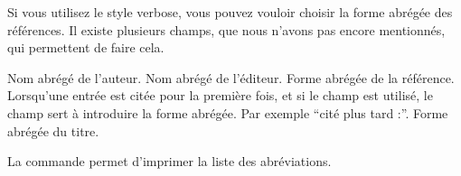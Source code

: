 Si vous utilisez le style verbose, vous pouvez vouloir choisir la forme abrégée des références. Il existe plusieurs champs, que nous n'avons pas encore mentionnés, qui permettent de faire cela.

\begin{fieldlist}
     Nom abrégé de l'auteur.
     Nom abrégé de l'éditeur.
     Forme abrégée de la référence.
     Lorsqu'une entrée est citée pour la première fois, et si le champ  est utilisé, le champ  sert à introduire la forme abrégée. Par exemple \enquote{cité plus tard :}.
     Forme abrégée du titre.
\end{fieldlist}

La commande  permet d'imprimer la liste des abréviations.



